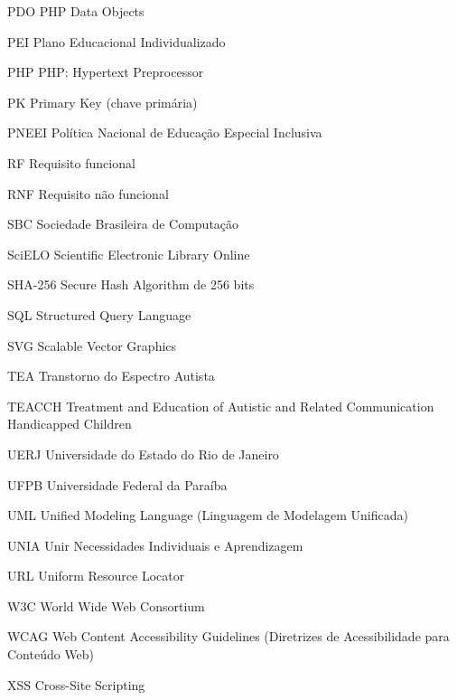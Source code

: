 \begin{siglas}
  \item[PDO] PHP Data Objects
  \item[PEI] Plano Educacional Individualizado
  \item[PHP] PHP: Hypertext Preprocessor
  \item[PK] Primary Key (chave primária)
  \item[PNEEI] Política Nacional de Educação Especial Inclusiva
  \item[RF] Requisito funcional
  \item[RNF] Requisito não funcional
  \item[SBC] Sociedade Brasileira de Computação
  \item[SciELO] Scientific Electronic Library Online
  \item[SHA-256] Secure Hash Algorithm de 256 bits
  \item[SQL] Structured Query Language
  \item[SVG] Scalable Vector Graphics
  \item[TEA] Transtorno do Espectro Autista
  \item[TEACCH] Treatment and Education of Autistic and Related Communication Handicapped Children
  \item[UERJ] Universidade do Estado do Rio de Janeiro
  \item[UFPB] Universidade Federal da Paraíba
  \item[UML] Unified Modeling Language (Linguagem de Modelagem Unificada)
  \item[UNIA] Unir Necessidades Individuais e Aprendizagem
  \item[URL] Uniform Resource Locator
  \item[W3C] World Wide Web Consortium
  \item[WCAG] Web Content Accessibility Guidelines (Diretrizes de Acessibilidade para Conteúdo Web)
  \item[XSS] Cross-Site Scripting
\end{siglas}
